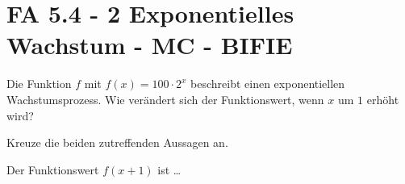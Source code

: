 \section{FA 5.4 - 2 Exponentielles Wachstum - MC - BIFIE}

\begin{beispiel}[FA 5.4]{1} %
Die Funktion $f$ mit $f(x) = 100 \cdot 2^x$ beschreibt einen exponentiellen Wachstumsprozess. Wie verändert sich der Funktionswert, wenn $x$ um $1$ erhöht wird?

\leer

Kreuze die beiden zutreffenden Aussagen an.

\leer

Der Funktionswert $f(x+1)$ ist \ldots


\end{beispiel}